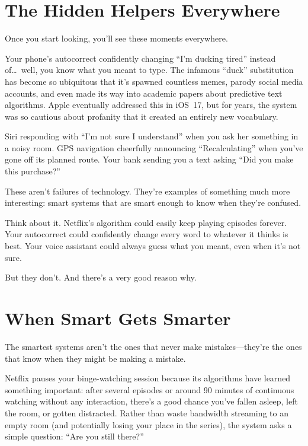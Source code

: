\section{The Hidden Helpers Everywhere}

Once you start looking, you'll see these moments everywhere.

Your phone's autocorrect confidently changing ``I'm ducking tired'' instead of\ldots\ well, you know what you meant to type. The infamous ``duck'' substitution has become so ubiquitous that it's spawned countless memes, parody social media accounts, and even made its way into academic papers about predictive text algorithms. Apple eventually addressed this in iOS~17, but for years, the system was so cautious about profanity that it created an entirely new vocabulary.

Siri responding with ``I'm not sure I understand'' when you ask her something in a noisy room. GPS navigation cheerfully announcing ``Recalculating'' when you've gone off its planned route. Your bank sending you a text asking ``Did you make this purchase?''

These aren't failures of technology. They're examples of something much more interesting: smart systems that are smart enough to know when they're confused.

Think about it. Netflix's algorithm could easily keep playing episodes forever. Your autocorrect could confidently change every word to whatever it thinks is best. Your voice assistant could always guess what you meant, even when it's not sure.

But they don't. And there's a very good reason why.

\section{When Smart Gets Smarter}

The smartest systems aren't the ones that never make mistakes---they're the ones that know when they might be making a mistake.

Netflix pauses your binge-watching session because its algorithms have learned something important: after several episodes or around 90 minutes of continuous watching without any interaction, there's a good chance you've fallen asleep, left the room, or gotten distracted. Rather than waste bandwidth streaming to an empty room (and potentially losing your place in the series), the system asks a simple question: ``Are you still there?''

